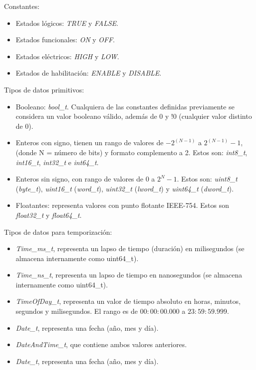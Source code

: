 Constantes:

\begin{itemize}
\item
Estados lógicos: \emph{TRUE} y \emph{FALSE}.
\item
Estados funcionales: \emph{ON} y \emph{OFF}.
\item
Estados eléctricos: \emph{HIGH} y \emph{LOW}.
\item
Estados de habilitación: \emph{ENABLE} y \emph{DISABLE}.
\end{itemize}

Tipos de datos primitivos: 

\begin{itemize}
\item
Booleano: \emph{bool\_t}. Cualquiera de las constantes definidas previamente se considera un valor booleano válido, además de 0 y !0 (cualquier valor distinto de 0).
\item
Enteros con signo, tienen un rango de valores de $-2^{(N-1)}$ a $2^{(N-1)} - 1$, (donde N = número de bits) y formato complemento a 2. Estos son: \emph{int8\_t}, \emph{int16\_t}, \emph{int32\_t} e \emph{int64\_t}.
\item
Enteros sin signo, con rango de valores de $0$ a $2^{N} - 1$. Estos son: \emph{uint8\_t} (\emph{byte\_t}), \emph{uint16\_t} (\emph{word\_t}), \emph{uint32\_t} (\emph{lword\_t}) y \emph{uint64\_t} (\emph{dword\_t}).
\item
Floatantes: representa valores con punto flotante IEEE-754. Estos son \emph{float32\_t} y \emph{float64\_t}.
\end{itemize}

Tipos de datos para temporización:

\begin{itemize}
\item
\emph{Time\_ms\_t}, representa un lapso de tiempo (duración) en milisegundos (se almacena internamente como uint64\_t).
\item
\emph{Time\_ns\_t}, representa un lapso de tiempo en nanosegundos (se almacena internamente como uint64\_t).
\item
\emph{TimeOfDay\_t}, representa un valor de tiempo absoluto en horas, minutos, segundos y milisegundos. El rango es de $00:00:00.000$ a $23:59:59.999$.
\item
\emph{Date\_t}, representa una fecha (año, mes y día).
\item
\emph{DateAndTime\_t}, que contiene ambos valores anteriores.
\item
\emph{Date\_t}, representa una fecha (año, mes y día).
\end{itemize}


